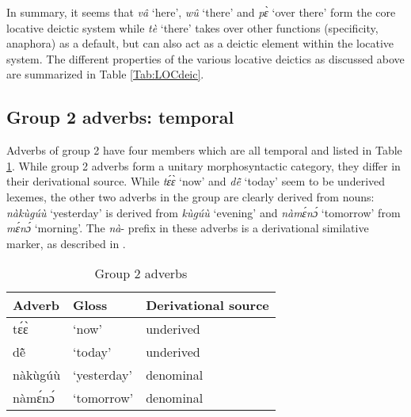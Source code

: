 In summary, it seems that {\itshape vâ} `here', {\itshape wû} `there' and {\itshape pɛ̀} `over there' form the core locative deictic system while {\itshape tè} `there' takes over other functions (specificity, anaphora) as a default, but can also act as a deictic element within the locative system. The different properties of the various locative deictics as discussed above are summarized in Table \ref{Tab:LOCdeic}.


\begin{table} 
\centering
{}
\caption{Morphosyntactic properties of locative deictics}
\label{Tab:LOCdeic}
\end{table} 





\subsection{Group 2 adverbs: temporal}
\label{sec:G2ADV}

Adverbs of group 2 have four members which are all temporal and listed in Table \ref{Tab:ADVGroup2}. While group 2 adverbs form a unitary morphosyntactic category, they differ in their derivational source. While {\itshape tɛ́ɛ̀} `now' and {\itshape dẽ̂} `today' seem to be underived lexemes, the other two adverbs in the group are clearly derived from nouns: {\itshape nàkùgúù} `yesterday' is derived from {\itshape kùgúù} `evening' and {\itshape nàmɛ́nɔ́} `tomorrow' from {\itshape mɛ́nɔ́} `morning'. The {\itshape nà}- prefix in these adverbs is a derivational similative marker, as described in .


\begin{table} 
\centering
\begin{tabular}{ll|l}
Adverb & Gloss & Derivational source \\  \midrule
tɛ́ɛ̀ & `now' & underived \\
dẽ̂ & `today'  & underived\\
nàkùgúù & `yesterday' & denominal \\
nàmɛ́nɔ́ & `tomorrow' & denominal \\
\end{tabular}
\caption{Group 2 adverbs}
\label{Tab:ADVGroup2}
\end{table} 


